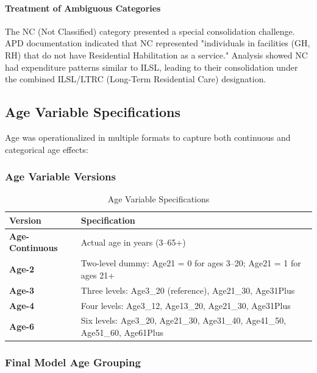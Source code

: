 \paragraph{Treatment of Ambiguous Categories}
The NC (Not Classified) category presented a special consolidation challenge. APD documentation indicated that NC represented "individuals in facilities (GH, RH) that do not have Residential Habilitation as a service." Analysis showed NC had expenditure patterns similar to ILSL, leading to their consolidation under the combined ILSL/LTRC (Long-Term Residential Care) designation.

\subsection{Age Variable Specifications}
\label{subsec:age-groupings}

Age was operationalized in multiple formats to capture both continuous and categorical age effects:

\subsubsection{Age Variable Versions}

\begin{table}[H]
\centering
\caption{Age Variable Specifications}
\begin{tabular}{lp{10cm}}
\toprule
\textbf{Version} & \textbf{Specification} \\
\midrule
\textbf{Age-Continuous} & Actual age in years (3--65+) \\
\midrule
\textbf{Age-2} & Two-level dummy: Age21 = 0 for ages 3--20; Age21 = 1 for ages 21+ \\
\midrule
\textbf{Age-3} & Three levels: Age3\_20 (reference), Age21\_30, Age31Plus \\
\midrule
\textbf{Age-4} & Four levels: Age3\_12, Age13\_20, Age21\_30, Age31Plus \\
\midrule
\textbf{Age-6} & Six levels: Age3\_20, Age21\_30, Age31\_40, Age41\_50, Age51\_60, Age61Plus \\
\bottomrule
\end{tabular}
\label{tab:age-specifications}
\end{table}

\subsubsection{Final Model Age Grouping}

